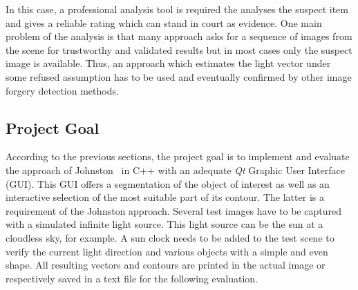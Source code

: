 In this case, a professional analysis tool is required the analyses the suspect item and gives a reliable rating which can stand in court as evidence. One main problem of the analysis is that many approach asks for a sequence of images from the scene for trustworthy and validated results but in most cases only the suspect image is available. Thus, an approach which estimates the light vector under some refused assumption has to be used and eventually confirmed by other image forgery detection methods. 

\subsection{Project Goal}\label{sec:Project Goal}

According to the previous sections, the project goal is to implement and evaluate the approach of Johnston~\cite{Johnson} in C++ with an adequate \textit{Qt} Graphic User Interface (GUI). This GUI offers a segmentation of the object of interest as well as an interactive selection of the most suitable part of its contour. The latter is a requirement of the Johnston approach. Several test images have to be captured with a simulated infinite light source. This light source can be the sun at a cloudless sky, for example. A sun clock needs to be added to the test scene to verify the current light direction and various objects with a simple and even shape. All resulting vectors and contours are printed in the actual image or respectively saved in a text file for the following evaluation.



\newpage


















